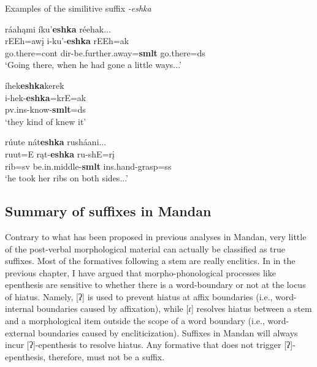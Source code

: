 \begin{exe}
\item\label{smlt2} Examples of the similitive suffix \textit{-eshka}

	\begin{xlist}
	
	\item \glll ráahąmi íku'\textbf{eshka} réehak...\\
	rEEh=awį i-ku'-\textbf{eshka} rEEh=ak\\
	\textnormal{go.there}=cont dir-\textnormal{be.further.away}=\textbf{smlt} \textnormal{go.there}=ds\\
	\glt `Going there, when he had gone a little ways...' \citep[68]{hollow1973b}
	
	\item \glll íhek\textbf{eshka}kerek\\
	i-hek-\textbf{eshka}=krE=ak\\
	pv.ins-\textnormal{know}-\textbf{smlt}=ds\\
	\glt `they kind of knew it' \citep[152]{hollow1973a}

	\item \glll rúute nát\textbf{eshka} rusháani...\\
	ruut=E rąt-\textbf{eshka} ru-shE=rį\\
	\textnormal{rib}=sv \textnormal{be.in.middle}-\textbf{smlt} ins.hand-\textnormal{grasp}=ss\\
	\glt `he took her ribs on both sides...' \citep[176]{hollow1973a}
	
	\end{xlist}

\end{exe}

\subsection{Summary of suffixes in Mandan}

Contrary to what has been proposed in previous analyses in Mandan, very little of the post-verbal morphological material can actually be classified as true suffixes. Most of the formatives following a stem are really enclitics. In  in the previous chapter, I have argued that morpho-phonological processes like epenthesis are sensitive to whether there is a word-boundary or not at the locus of hiatus. Namely, [ʔ] is used to prevent hiatus at affix boundaries (i.e., word-internal boundaries caused by affixation), while [ɾ] resolves hiatus between a stem and a morphological item outside the scope of a word boundary (i.e., word-external boundaries caused by encliticization). Suffixes in Mandan will always incur [ʔ]-epenthesis to resolve hiatus. Any formative that does not trigger [ʔ]-epenthesis, therefore, must not be a suffix.

